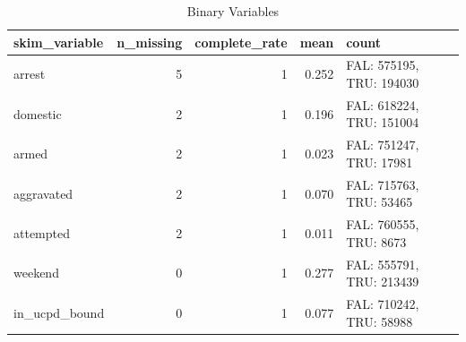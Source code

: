 \documentclass{ucetd}
\begin{document}
\begin{table}

\caption{\label{tab:descr-stats}Binary Variables}
\centering
\begin{tabular}[t]{lrrrl}
\toprule
skim\_variable & n\_missing & complete\_rate & mean & count\\
\midrule
arrest & 5 & 1 & 0.252 & FAL: 575195, TRU: 194030\\
domestic & 2 & 1 & 0.196 & FAL: 618224, TRU: 151004\\
armed & 2 & 1 & 0.023 & FAL: 751247, TRU: 17981\\
aggravated & 2 & 1 & 0.070 & FAL: 715763, TRU: 53465\\
attempted & 2 & 1 & 0.011 & FAL: 760555, TRU: 8673\\
\addlinespace
weekend & 0 & 1 & 0.277 & FAL: 555791, TRU: 213439\\
in\_ucpd\_bound & 0 & 1 & 0.077 & FAL: 710242, TRU: 58988\\
\bottomrule
\end{tabular}
\end{table}
\end{document}

